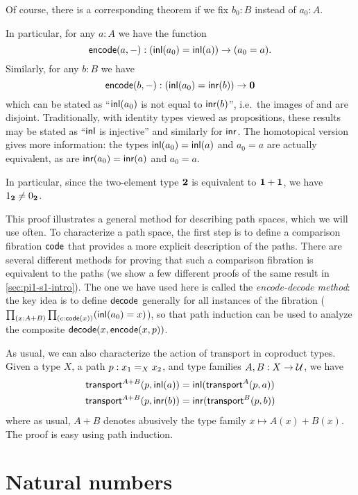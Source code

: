 Of course, there is a corresponding theorem if we fix $b_0:B$ instead of $a_0:A$.  

In particular, for any $a:A$ we have the function
\[ \encode(a,-) : (\inl(a_0)=\inl(a)) \to (a_0=a).\]
Similarly, for any $b:B$ we have
\[ \encode(b,-) : (\inl(a_0)=\inr(b)) \to \emptyt \] which can be stated as
``$\inl(a_0)$ is not equal to $\inr(b)$'', i.e.\ the images of \inl and \inr are
disjoint.  Traditionally, with identity types viewed as propositions, these
results may be stated as ``$\inl$ is injective'' and similarly for $\inr$.  The
homotopical version gives more information: the types $\inl(a_0)=\inl(a)$ and
$a_0=a$ are actually equivalent, as are $\inr(a_0)=\inr(a)$ and $a_0=a$.

\begin{rmk}\label{rmk:true-neq-false}
In particular, since the two-element type $\bool$ is equivalent to $\unit+\unit$, we have $\btrue\neq\bfalse$.
\end{rmk}

This proof illustrates a general method for describing path spaces, which we will use often.  To characterize a path space, the first step is to define a comparison fibration $\code$ that provides a more explicit description of the paths.  There are several different methods for proving that such a comparison fibration is equivalent to the paths (we show a few different proofs of the same result in \autoref{sec:pi1-s1-intro}).  The one we have used here is called the \emph{encode-decode method}: the key idea is to define $\decode$ generally for all instances of the fibration ($\prd{x:A+B}{c:\code(x)} (\inl(a_0)=x)$), so that path induction can be used to analyze the composite $\decode(x,\encode(x,p))$.  

As usual, we can also characterize the action of transport in coproduct types.
Given a type $X$, a path $p:\id[X]{x_1}{x_2}$, and type families $A,B:X\to\type$, we have
\begin{align*}
  \transfib{A+B}{p}{\inl(a)} &= \inl (\transfib{A}{p}{a})\\
  \transfib{A+B}{p}{\inr(b)} &= \inr (\transfib{B}{p}{b})
\end{align*}
where as usual, $A+B$ denotes abusively the type family $x\mapsto A(x)+B(x)$.
The proof is easy using path induction.


\section{Natural numbers}
\label{sec:compute-nat}

